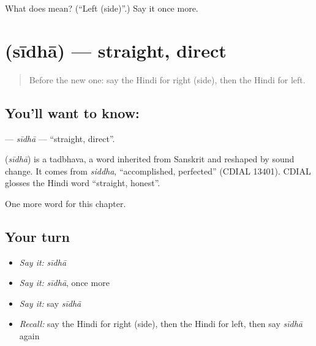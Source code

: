 \begin{tcolorbox}[breakable,colback=teal!4,colframe=teal!35!black,title={Before you move on}]
What does  mean? (\textquotedblleft{}Left (side)\textquotedblright{}.) Say it once more.
\end{tcolorbox}
\section[\texorpdfstring{\hi{सीधा} (sīdhā)}{सीधा (sīdhā)}]{ (sīdhā) — straight, direct}

\label{lesson:HI-C234-sidha}



\begin{quote}
Before the new one: say the Hindi for right (side), then the Hindi for left.
\end{quote}

\subsection*{You'll want to know: }
\textbf{} — \emph{sīdhā} — \textquotedblleft{}straight, direct\textquotedblright{}.

\begin{cousinweb}
\textbf{} (\emph{sīdhā}) is a tadbhava, a word inherited from Sanskrit and reshaped by sound change. It comes from \emph{siddha}, \textquotedblleft{}accomplished, perfected\textquotedblright{} (CDIAL 13401). CDIAL glosses the Hindi word \textquotedblleft{}straight, honest\textquotedblright{}.
\end{cousinweb}

\begin{grammarlens}[title={What you've built}]
One more word for this chapter.
\end{grammarlens}

\subsection*{Your turn}
\begin{itemize}
\raggedright
  \item \emph{Say it:} \emph{sīdhā}
  \item \emph{Say it:} \emph{sīdhā}, once more
  \item \emph{Say it:} say \emph{sīdhā}
  \item \emph{Recall:} say the Hindi for right (side), then the Hindi for left, then say \emph{sīdhā} again
\end{itemize}

